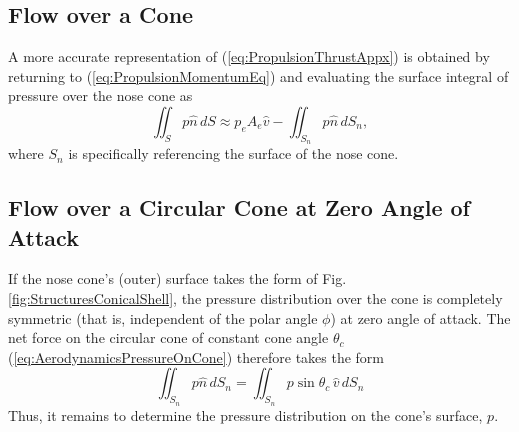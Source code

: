 \documentclass[11pt,dvipsnames]{thesis}
\begin{document}
\subsection{Flow over a Cone}
A more accurate representation of (\ref{eq:PropulsionThrustAppx}) is obtained by returning to (\ref{eq:PropulsionMomentumEq}) and evaluating the surface integral of pressure over the nose cone as
\begin{equation}
\iint_S p\hat{n} \,dS \approx p_e A_e \hat{v} - \iint_{S_n} p\hat{n} \,dS_n,
\end{equation}
where $S_n$ is specifically referencing the surface of the nose cone. 

\subsection{Flow over a Circular Cone at Zero Angle of Attack}
If the nose cone's (outer) surface takes the form of Fig. \ref{fig:StructuresConicalShell}, the pressure distribution over the cone is completely symmetric (that is, independent of the polar angle $\phi$) at zero angle of attack.
The net force on the circular cone of constant cone angle $\theta_c$ (\ref{eq:AerodynamicsPressureOnCone}) therefore takes the form
\begin{equation}
\iint_{S_n} p\hat{n} \,dS_n = \iint_{S_n} p \sin\theta_c \,\hat{v} \,dS_n \label{eq:AerodynamicsPressureOnCone}
\end{equation}
Thus, it remains to determine the pressure distribution on the cone's surface, $p$.
\end{document}
